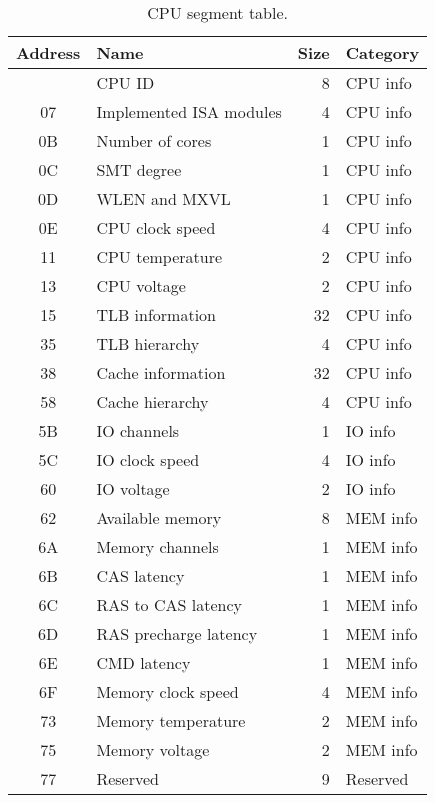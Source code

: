 \begin{table}[hbt!] %

    \begin{center}

    \begin{tabular}{|c|l|r|l|}

        \hline
        Address & Name & Size & Category\\
        \hline
        \addlinespace[10pt]
        \hline
        00 & CPU ID & 8 & CPU info\\
        \hline
        07 & Implemented ISA modules & 4 & CPU info\\
        \hline
        0B & Number of cores & 1 & CPU info\\
        \hline
        0C & SMT degree & 1 & CPU info\\
        \hline
        0D & WLEN and MXVL & 1 & CPU info\\
        \hline
        0E & CPU clock speed & 4 & CPU info\\
        \hline
        11 & CPU temperature & 2 & CPU info\\
        \hline
        13 & CPU voltage & 2 & CPU info\\
        \hline
        15 & TLB information & 32 & CPU info\\
        \hline
        35 & TLB hierarchy & 4 & CPU info\\
        \hline
        38 & Cache information & 32 & CPU info\\
        \hline
        58 & Cache hierarchy & 4 & CPU info\\
        \hline
        5B & IO channels & 1 & IO info\\
        \hline
        5C & IO clock speed & 4 & IO info\\
        \hline
        60 & IO voltage & 2 & IO info\\
        \hline
        62 & Available memory & 8 & MEM info\\
        \hline
        6A & Memory channels & 1 & MEM info\\
        \hline
        6B & CAS latency & 1 & MEM info\\
        \hline
        6C & RAS to CAS latency & 1 & MEM info\\
        \hline
        6D & RAS precharge latency & 1 & MEM info\\
        \hline
        6E & CMD latency & 1 & MEM info\\
        \hline
        6F & Memory clock speed & 4 & MEM info\\
        \hline
        73 & Memory temperature & 2 & MEM info\\
        \hline
        75 & Memory voltage & 2 & MEM info\\
        \hline
        77 & Reserved & 9 & Reserved\\
        \hline

    \end{tabular}

    \caption[CPU segment table]{CPU segment table.}

    \end{center}

\end{table}